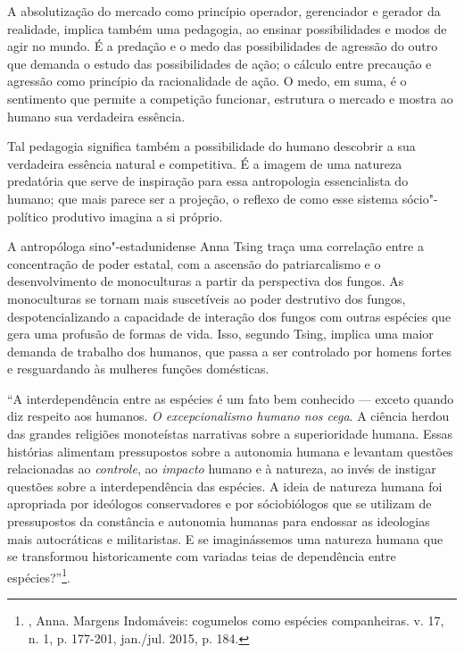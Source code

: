 \asterisc

A absolutização do mercado como princípio operador, gerenciador e
gerador da realidade, implica também uma pedagogia, ao ensinar
possibilidades e modos de agir no mundo. É a predação e o medo das
possibilidades de agressão do outro que demanda o estudo das
possibilidades de ação; o cálculo entre precaução e agressão como
princípio da racionalidade de ação. O medo, em suma, é o sentimento que
permite a competição funcionar, estrutura o mercado e mostra ao humano
sua verdadeira essência.

Tal pedagogia significa também a possibilidade do humano descobrir a sua
verdadeira essência natural e competitiva. É a imagem de uma natureza
predatória que serve de inspiração para essa antropologia essencialista
do humano; que mais parece ser a projeção, o reflexo de como esse
sistema sócio"-político produtivo imagina a si próprio.

A antropóloga sino"-estadunidense Anna Tsing traça uma correlação entre a
concentração de poder estatal, com a ascensão do patriarcalismo e o
desenvolvimento de monoculturas a partir da perspectiva dos fungos. As
monoculturas se tornam mais suscetíveis ao poder destrutivo dos fungos,
despotencializando a capacidade de interação dos fungos com outras
espécies que gera uma profusão de formas de vida. Isso, segundo Tsing,
implica uma maior demanda de trabalho dos humanos, que passa a ser
controlado por homens fortes e resguardando às mulheres funções
domésticas.

``A interdependência entre as espécies é um fato bem conhecido --- exceto
quando diz respeito aos humanos. \emph{O excepcionalismo humano nos
cega}. A ciência herdou das grandes religiões monoteístas narrativas
sobre a superioridade humana. Essas histórias alimentam pressupostos
sobre a autonomia humana e levantam questões relacionadas ao
\emph{controle}, ao \emph{impacto} humano e à natureza, ao invés de
instigar questões sobre a interdependência das espécies. A ideia de
natureza humana foi apropriada por ideólogos conservadores e por
sóciobiólogos que se utilizam de pressupostos da constância e autonomia
humanas para endossar as ideologias mais autocráticas e militaristas. E
se imaginássemos uma natureza humana que se transformou historicamente
com variadas teias de dependência entre espécies?''\footnote{,
  Anna. Margens Indomáveis: cogumelos como espécies companheiras. 
  v. 17, n. 1, p. 177-201, jan./jul. 2015, p. 184.}.

\asterisc


